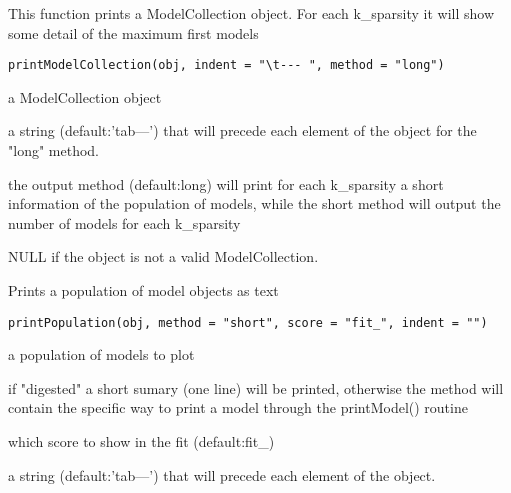 \documentclass[a4paper]{book}
\begin{document}
%
\begin{Description}
This function prints a ModelCollection object. For each k\_sparsity it will show some detail of 
the maximum first models
\end{Description}
%
\begin{Usage}
\begin{verbatim}
printModelCollection(obj, indent = "\t--- ", method = "long")
\end{verbatim}
\end{Usage}
%
\begin{Arguments}
\begin{ldescription}
\item[\code{obj:}] a ModelCollection object

\item[\code{indent:}] a string (default:'tab---') that will precede each element of the object for the "long" method.

\item[\code{method:}] the output method (default:long) will print for each k\_sparsity a short information of the population of models, 
while the short method will output the number of models for each k\_sparsity
\end{ldescription}
\end{Arguments}
%
\begin{Value}
NULL if the object is not a valid ModelCollection.
\end{Value}
%
\begin{Description}
Prints a population of model objects as text
\end{Description}
%
\begin{Usage}
\begin{verbatim}
printPopulation(obj, method = "short", score = "fit_", indent = "")
\end{verbatim}
\end{Usage}
%
\begin{Arguments}
\begin{ldescription}
\item[\code{obj:}] a population of models to plot

\item[\code{method:}] if "digested" a short sumary (one line) will be printed, otherwise the method will contain the 
specific way to print a model through the printModel() routine

\item[\code{score:}] which score to show in the fit (default:fit\_)

\item[\code{indent:}] a string (default:'tab---') that will precede each element of the object.
\end{ldescription}
\end{Arguments}
\end{document}
